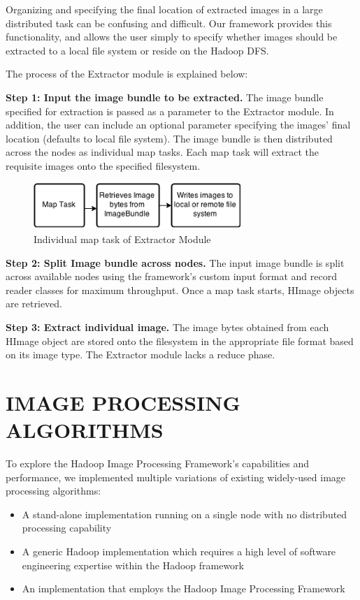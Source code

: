 \documentclass{osuthesis}
\begin{document}
				Organizing and specifying the final location of extracted images in a
				large distributed task can be confusing and difficult.  Our framework
				provides this functionality, and allows the user simply to specify
				whether images should be extracted to a local file system or reside on
				the Hadoop DFS.
				
				The process of the Extractor module is explained below:
				
				\textbf{Step 1: Input the image bundle to be extracted.} The image
				bundle specified for extraction is passed as a parameter to the
				Extractor module.  In addition, the user can include an optional
				parameter specifying the images' final location (defaults to local
				file system).  The image bundle is then distributed across the nodes
				as individual map tasks. Each map task will extract the requisite
				images onto the specified filesystem.
				
				\begin{figure}[h]
					\centering
					\includegraphics[width=0.70\textwidth]{ext-map}
					\caption{Individual map task of Extractor Module}
					\label{fig:ext-map}
				\end{figure}
				
				\textbf{Step 2: Split Image bundle across nodes.} The input image
				bundle is split across available nodes using the framework's custom
				input format and record reader classes for maximum throughput. Once a
				map task starts, HImage objects are retrieved.
				
				\textbf{Step 3: Extract individual image.} The image bytes obtained
				from each HImage object are stored onto the filesystem in the
				appropriate file format based on its image type.  The Extractor module
				lacks a reduce phase.
				
				
				
				\chapter{IMAGE PROCESSING ALGORITHMS}
				\label{algorithms}
				To explore the Hadoop Image Processing Framework's capabilities and
				performance, we implemented multiple variations of existing
				widely-used image processing algorithms:
				\begin{itemize}
					\item A stand-alone implementation running on a single node with no
					distributed processing capability
					\item A generic Hadoop implementation which requires a high level of
					software engineering expertise within the Hadoop framework
					\item An implementation that employs the Hadoop Image Processing
					Framework
					\end{itemize}
					
\end{document}
